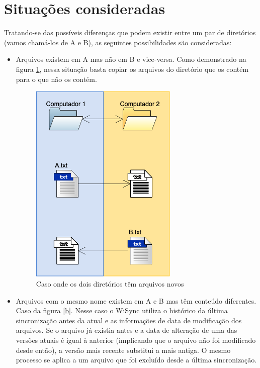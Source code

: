 \section{Situações consideradas}
Tratando-se das possíveis diferenças que podem existir entre um par de diretórios (vamos chamá-los de A e B), as seguintes possibilidades são consideradas:
\begin{itemize}
  \item Arquivos existem em A mas não em B e vice-versa. Como demonstrado na figura \ref{a}, nessa situação basta copiar os arquivos do diretório que os contém para o que não os contém.
  \begin{figure}[h]
    \centering
    \includegraphics[width=200pt]{img/a.png}
    \caption{Caso onde os dois diretórios têm arquivos novos}
    \label{a}
  \end{figure}
  \item Arquivos com o mesmo nome existem em A e B mas têm conteúdo diferentes. Caso da figura \ref{b}. Nesse caso o WiSync utiliza o histórico da última sincronização antes da atual e as informações de data de modificação dos arquivos. Se o arquivo já existia antes e a data de alteração de uma das versões atuais é igual à anterior (implicando que o arquivo não foi modificado desde então), a versão mais recente substitui a mais antiga. O mesmo processo se aplica a um arquivo que foi excluído desde a última sincronização.
  \begin{figure}[h]
    \centering

\end{figure}
\end{itemize}
